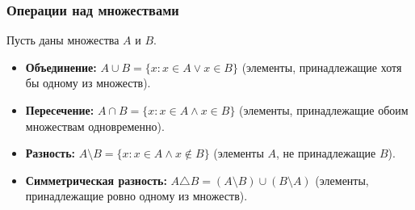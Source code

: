 \documentclass[a4paper,12pt]{article}
\begin{document}
\subsubsection{Операции над множествами}
Пусть даны множества $A$ и $B$.
\begin{itemize}
	\item \textbf{Объединение:} $A \cup B = \{x : x \in A \lor x \in B\}$ (элементы, принадлежащие хотя бы одному из множеств).
	\item \textbf{Пересечение:} $A \cap B = \{x : x \in A \land x \in B\}$ (элементы, принадлежащие обоим множествам одновременно).
	\item \textbf{Разность:} $A \setminus B = \{x : x \in A \land x \notin B\}$ (элементы $A$, не принадлежащие $B$).
	\item \textbf{Симметрическая разность:} $A \triangle B = (A \setminus B) \cup (B \setminus A)$ (элементы, принадлежащие ровно одному из множеств).
\end{itemize}
\end{document}
